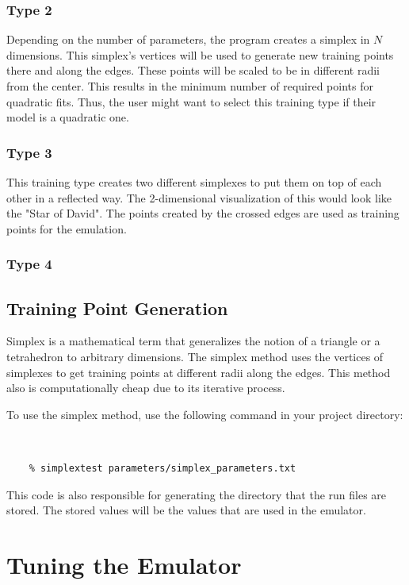 \documentclass[12pt]{article}
\numberwithin{equation}{section}
\numberwithin{figure}{section}
\begin{document}
\subsubsection{Type 2}

 Depending on the number of parameters, the program creates a simplex in $N$ dimensions. This simplex's vertices will be used to generate new training points there and along the edges. These points will be scaled to be in different radii from the center. This results in the minimum number of required points for quadratic fits. Thus, the user might want to select this training type if their model is a quadratic one.
 
\subsubsection{Type 3}
This training type creates two different simplexes to put them on top of each other in a reflected way. The 2-dimensional visualization of this would look like the "Star of David". The points created by the crossed edges are used as training points for the emulation.
 
\subsubsection{Type 4}

\subsection{Training Point Generation}

Simplex is a mathematical term that generalizes the notion of a triangle or a tetrahedron to arbitrary dimensions. The simplex method uses the vertices of simplexes to get training points at different radii along the edges. This method also is computationally cheap due to its iterative process.

To use the simplex method, use the following command in your project directory:

{\tt
{
\begin{verbatim}
    % simplextest parameters/simplex_parameters.txt
\end{verbatim}
}}

This code is also responsible for generating the directory that the run files are stored. The stored values will be the values that are used in the emulator.

\section{Tuning the Emulator}
\end{document}
